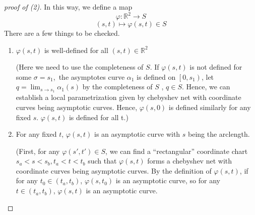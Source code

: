 \begin{proof}[proof of (2)]
    In this way, we define a map 
    \[
        \varphi\colon \mathbb{R}^2\to S
    \]
    \[(s,t)\mapsto \varphi(s,t)\in S\]
    There are a few things to be checked.
    \begin{enumerate}[(1)]
        \item \(\varphi(s,t)\) is well-defined for all \((s,t)\in 
        \mathbb{R}^2\)

    (Here we need to use the completeness of \(S\). 
    If \(\varphi(s,t)\) is not defined for some
    \(\sigma=s_1\),\ie\ the asymptotes curve \(\alpha_1\) 
    is defined on \(\left[0,s_1\right)\), let \(
      q=\lim_{s\to s_1}\alpha_1(s)  
    \) by the
    completeness of \(S\) , \(q\in S\). 
    Hence, we can establish a local parametrization 
    given by chebyshev net
    with coordinate curves being asymptotic curves. 
    Hence, \(\varphi(s,0)\) is defined similarly for any
    fixed \(s\). \(\varphi(s,t)\) is defined for all t.)
    \item For any fixed \(t\), \(\varphi(s,t)\) is an asymptotic
    curve with \(s\) being the arclength.

    (First, for any \(\varphi(s',t')\in S\), we can find a 
    ``rectangular'' coordinate chart \(s_a<s<s_b, t_a<t<t_b\)
    such that \(\varphi(s,t)\) forms a chebyshev net with coordinate 
    curves being asymptotic curves. 
    By the definition of \(\varphi(s,t)\), if for any \(t_0\in 
    (t_a,t_b)\), \(\varphi(s,t_0)\) is an asymptotic curve, so 
    for any \(t\in (t_a,t_b)\), \(\varphi(s,t)\) is an asymptotic curve.


\end{enumerate}
\end{proof}
